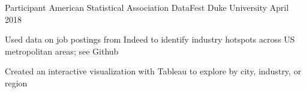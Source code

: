 


\begin{cventries}


\cventry
{Participant} %
{American Statistical Association DataFest } %
{Duke University} %
{April 2018} %
{ %
\begin{cvitems}
\item {Used data on job postings from Indeed to identify industry hotspots across US metropolitan areas; see Github}
\item {Created an interactive visualization with Tableau to explore by city, industry, or region}
\end{cvitems}
}














\end{cventries}